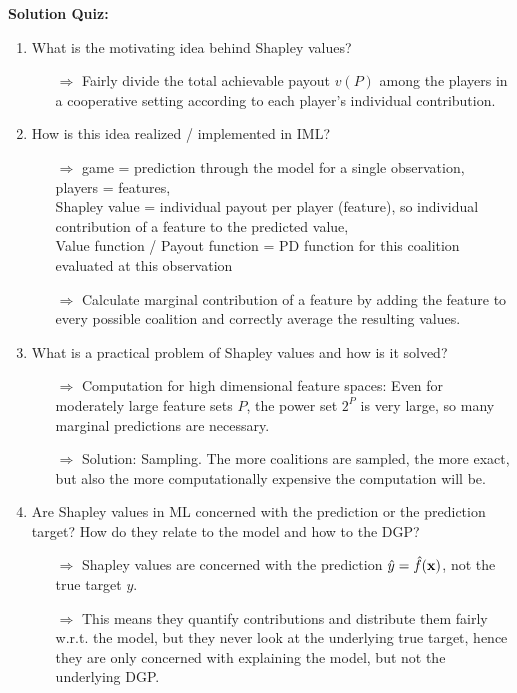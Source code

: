 \textbf{Solution Quiz:}\\\noindent
\medskip

\begin{enumerate}
	\item What is the motivating idea behind Shapley values? 
	\begin{itemize}
		\item[$\Rightarrow$] Fairly divide the total achievable payout $v(P)$ among the players in a cooperative setting according to each player’s individual contribution.
	\end{itemize}
	\item How is this idea realized / implemented in IML?
	\begin{itemize}
		\item[$\Rightarrow$]
        game = prediction through the model for a single observation, \\
        players = features, \\
        Shapley value = individual payout per player (feature), so individual contribution of a feature to the predicted value, \\
        Value function / Payout function = PD function for this coalition evaluated at this observation
		\item[$\Rightarrow$] Calculate marginal contribution of a feature by adding the feature to every possible coalition and correctly average the resulting values.
	\end{itemize}
	\item What is a practical problem of Shapley values and how is it solved?
	\begin{itemize}
		\item[$\Rightarrow$] Computation for high dimensional feature spaces: Even for moderately large feature sets $P$, the power set $2^P$ is very large, so many marginal predictions are necessary.
		\item[$\Rightarrow$] Solution: Sampling. The more coalitions are sampled, the more exact, but also the more computationally expensive the computation will be.
	\end{itemize}
    \item Are Shapley values in ML concerned with the prediction or the prediction target? How do they relate to the model and how to the DGP?
	\begin{itemize}
		\item[$\Rightarrow$] Shapley values are concerned with the prediction $\hat{y} = \hat{f}(\mathbf{x})$, not the true target $y$.
		\item[$\Rightarrow$] This means they quantify contributions and distribute them fairly w.r.t. the model, but they never look at the underlying true target, hence they are only concerned with explaining the model, but not the underlying DGP.

\end{itemize}
\end{enumerate}

